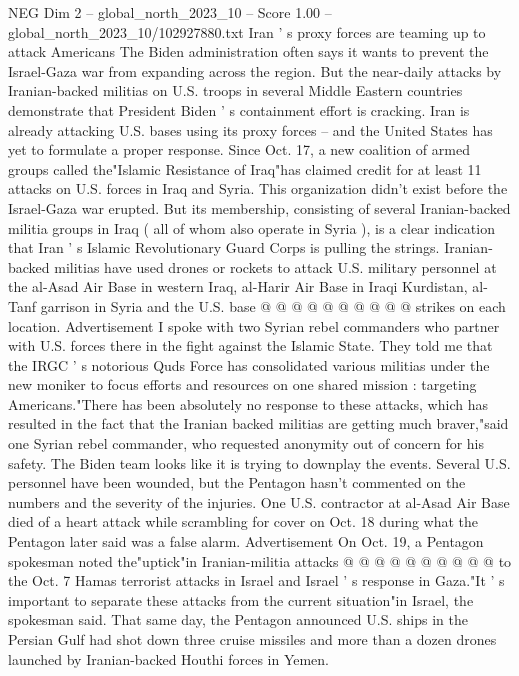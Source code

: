 \begin{textsample}{NEG Dim 2 – global\_north\_2023\_10 – Score 1.00 – global\_north\_2023\_10/102927880.txt}  \label{ex:f2_neg_164}
Iran ' s proxy forces are teaming up to attack Americans The Biden administration often says it wants to prevent the Israel-Gaza war from expanding across the region.
But the near-daily attacks by Iranian-backed militias on U.S. troops in several Middle Eastern countries demonstrate that President Biden ' s containment effort is cracking.
Iran is already attacking U.S. bases using its proxy forces -- and the United States has yet to formulate a proper response.
Since Oct. 17, a new coalition of armed groups called the"Islamic Resistance of Iraq"has claimed credit for at least 11 attacks on U.S. forces in Iraq and Syria.
This organization didn't exist before the Israel-Gaza war erupted.
But its membership, consisting of several Iranian-backed militia groups in Iraq ( all of whom also operate in Syria ), is a clear indication that Iran ' s Islamic Revolutionary Guard Corps is pulling the strings.
Iranian-backed militias have used drones or rockets to attack U.S. military personnel at the al-Asad Air Base in western Iraq, al-Harir Air Base in Iraqi Kurdistan, al-Tanf garrison in Syria and the U.S. base @ @ @ @ @ @ @ @ @ @ strikes on each location.
Advertisement I spoke with two Syrian rebel commanders who partner with U.S. forces there in the fight against the Islamic State.
They told me that the IRGC ' s notorious Quds Force has consolidated various militias under the new moniker to focus efforts and resources on one shared mission : targeting Americans."There has been absolutely no response to these attacks, which has resulted in the fact that the Iranian backed militias are getting much braver,"said one Syrian rebel commander, who requested anonymity out of concern for his safety.
The Biden team looks like it is trying to downplay the events.
Several U.S. personnel have been wounded, but the Pentagon hasn't commented on the numbers and the severity of the injuries.
One U.S. contractor at al-Asad Air Base died of a heart attack while scrambling for cover on Oct. 18 during what the Pentagon later said was a false alarm.
Advertisement On Oct. 19, a Pentagon spokesman noted the"uptick"in Iranian-militia attacks @ @ @ @ @ @ @ @ @ @ to the Oct. 7 Hamas terrorist attacks in Israel and Israel ' s response in Gaza."It ' s important to separate these attacks from the current situation"in Israel, the spokesman said.
That same day, the Pentagon announced U.S. ships in the Persian Gulf had shot down three cruise missiles and more than a dozen drones launched by Iranian-backed Houthi forces in Yemen.

\end{textsample}
